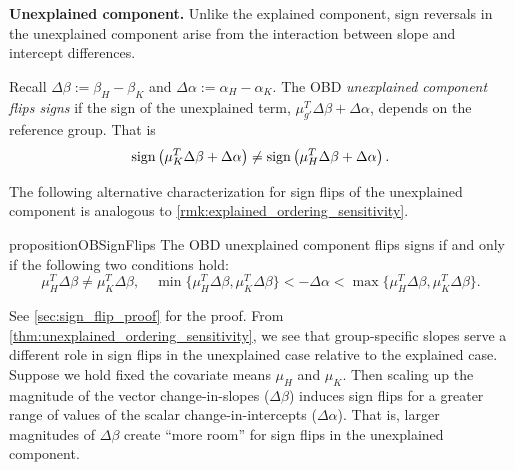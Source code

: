 \textbf{Unexplained component.}
Unlike the explained component, sign reversals in the unexplained component arise from the interaction between slope and intercept differences.
\begin{definition}
    \label{def:unexplained_sign_flip}
	Recall $\Delta\beta := \beta_H - \beta_K$ and $\Delta\alpha := \alpha_H - \alpha_K$. The OBD \emph{unexplained component flips signs} if the sign of the unexplained term, $\mu_{g'}^T \Delta\beta + \Delta\alpha$, depends on the reference group. That is
	\begin{equation}
		\operatorname{sign}\left( \mu_K^T \Delta\beta + \Delta\alpha \right) \neq \operatorname{sign}\left( \mu_H^T \Delta\beta + \Delta\alpha \right).
	\end{equation}
\end{definition}

The following alternative characterization for sign flips of the unexplained component is analogous to \cref{rmk:explained_ordering_sensitivity}.
%
\begin{restatable}{proposition}{OBSignFlips}
    \label{thm:unexplained_ordering_sensitivity}
    The OBD unexplained component flips signs if and only if the following two conditions hold:
    \begin{equation}
    \label{eq:sign_flip_condition}
        \mu_H^T \Delta\beta \neq \mu_K^T \Delta\beta, \quad \min\{\mu_H^T \Delta\beta, \mu_K^T \Delta\beta\} < -\Delta\alpha < \max\{\mu_H^T \Delta\beta, \mu_K^T \Delta\beta\}.
    \end{equation}
\end{restatable}    
See \cref{sec:sign_flip_proof} for the proof.
From \cref{thm:unexplained_ordering_sensitivity}, we see that group-specific slopes serve a different role in sign flips in the unexplained case relative to the explained case.
Suppose we hold fixed the covariate means $\mu_H$ and $\mu_K$. Then scaling up the magnitude of the vector change-in-slopes ($\Delta \beta$) induces sign flips for a greater range of values 
of the scalar change-in-intercepts ($\Delta \alpha$).
That is, larger magnitudes of \( \Delta \beta \) create ``more room'' for sign flips in the unexplained component.


